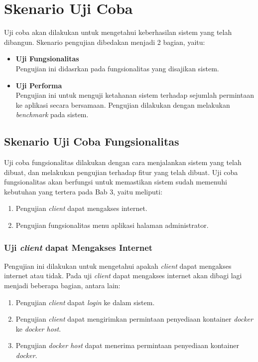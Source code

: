    
\section{Skenario Uji Coba} \label{skenarioujicoba}
	Uji coba akan dilakukan untuk mengetahui keberhasilan sistem yang telah dibangun. Skenario pengujian dibedakan menjadi 2 bagian, yaitu:
    \begin{itemize}
    \item \textbf{Uji Fungsionalitas} \\
    	Pengujian ini didasrkan pada fungsionalitas yang disajikan sistem.
    \item \textbf{Uji Performa} \\
    	Pengujian ini untuk menguji ketahanan sistem terhadap sejumlah permintaan ke aplikasi secara bersamaan. Pengujian dilakukan dengan melakukan \textit{benchmark} pada sistem.
    \end{itemize}
    
\subsection{Skenario Uji Coba Fungsionalitas}
Uji coba fungsionalitas dilakukan dengan cara menjalankan sistem yang telah dibuat, dan melakukan pengujian terhadap fitur yang telah dibuat. Uji coba fungsionalitas akan berfungsi untuk memastikan sistem sudah memenuhi kebutuhan yang tertera pada Bab 3, yaitu meliputi:

\begin{enumerate}
\item Pengujian \textit{client} dapat mengakses internet.
\item Pengujian fungsionalitas menu aplikasi halaman administrator.
\end{enumerate}

\subsubsection{Uji \textit{client} dapat Mengakses Internet} \label{keempat}
Pengujian ini dilakukan untuk mengetahui apakah \textit{client} dapat mengakses internet atau tidak. Pada uji \textit{client} dapat mengakses internet akan dibagi lagi menjadi beberapa bagian, antara lain:
\begin{enumerate}
\item Pengujian \textit{client} dapat \textit{login} ke dalam sistem.
\item Pengujian \textit{client} dapat mengirimkan permintaan penyediaan kontainer \textit{docker} ke \textit{docker host}.
\item Pengujian \textit{docker host} dapat menerima permintaan penyediaan kontainer \textit{docker}.
\end{enumerate}

